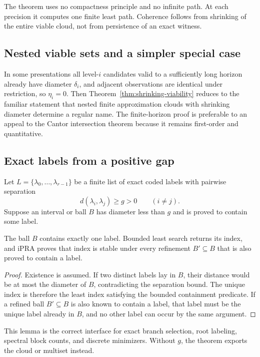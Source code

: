 The theorem uses no compactness principle and no infinite path.  At each
precision it computes one finite least path.  Coherence follows from shrinking
of the entire viable cloud, not from persistence of an exact witness.

\subsection{Nested viable sets and a simpler special case}

In some presentations all level-\(i\) candidates valid to a sufficiently long
horizon already have diameter \(\delta_i\), and adjacent observations are
identical under restriction, so \(\eta_i=0\).  Then
Theorem~\ref{thm:shrinking-viability} reduces to the familiar statement that
nested finite approximation clouds with shrinking diameter determine a
regular name.  The finite-horizon proof is preferable to an appeal to the
Cantor intersection theorem because it remains first-order and quantitative.

\subsection{Exact labels from a positive gap}

Let \(L=\{\lambda_0,\ldots,\lambda_{r-1}\}\) be a finite list of exact coded
labels with pairwise separation
\[
 d(\lambda_i,\lambda_j)\geq g>0\qquad(i\neq j).
\]
Suppose an interval or ball \(B\) has diameter less than \(g\) and is proved to
contain some label.

\begin{lemma}
\label{lem:gap-collapse}
The ball \(B\) contains exactly one label.  Bounded least search returns its
index, and iPRA proves that index is stable under every refinement
\(B'\subseteq B\) that is also proved to contain a label.
\end{lemma}

\begin{proof}
Existence is assumed.  If two distinct labels lay in \(B\), their distance
would be at most the diameter of \(B\), contradicting the separation bound.
The unique index is therefore the least index satisfying the bounded
containment predicate.  If a refined ball \(B'\subseteq B\) is also known to
contain a label, that label must be the unique label already in \(B\), and no
other label can occur by the same argument.
\end{proof}

This lemma is the correct interface for exact branch selection, root labeling,
spectral block counts, and discrete minimizers.  Without \(g\), the theorem
exports the cloud or multiset instead.


